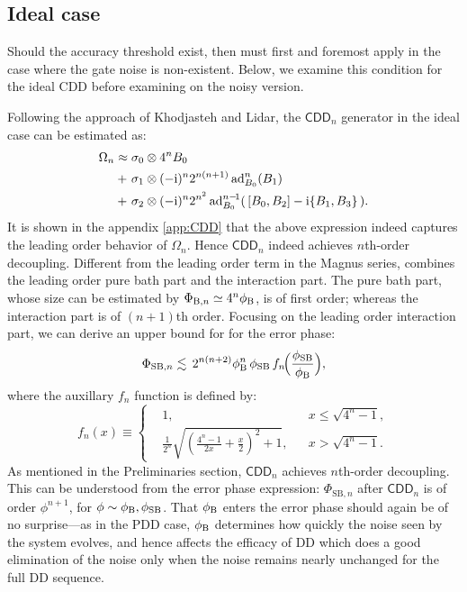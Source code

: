 \documentclass[pra,reprint,superscriptaddress]{revtex4-2}
\newcommand{\CDDn}{\mathsf{CDD}_n}
\begin{document}
\subsection{Ideal case}
Should the accuracy threshold exist, then  must first and foremost apply in the case where the gate noise is non-existent. 
 Below, we examine this condition for the ideal CDD before examining on the noisy version.

Following the approach of Khodjasteh and Lidar, the $\CDDn$ generator in the ideal case can be estimated as:
\begin{align}\label{eq:cdd-generator-est}
\Omega_{n} 
\approx {} & \sigma_0 \otimes 4^n B_0 \notag \\
+\ & \sigma_1 \otimes (-\mathrm{i})^{n} 2^{n(n+1)} \operatorname{ad}_{B_0}^{n}(B_1)\\ 
+\ & \sigma_2 \otimes (-\mathrm{i})^{n} 2^{n^2} \operatorname{ad}_{B_0}^{n-\!1}( \,[B_0,B_2] - \mathrm{i} \{B_1,B_3\} \,). \notag
\end{align} 
It is shown in the appendix \ref{app:CDD}   that the above expression indeed captures the leading order behavior of $\Omega_{n}$. Hence $\CDDn$ indeed achieves $n$th-order decoupling. Different from the leading order term in the Magnus series,  combines the leading order pure bath part and the interaction part. 
The pure bath part, whose size can be estimated by $\Phi_{\mathrm{B},n} \simeq 4^n\phi_{\mathrm{B}}$, is of first order; whereas the interaction part is of $(n+1)$th order. 
Focusing on the leading order interaction part, we can derive an upper bound for for the error phase: 
\begin{equation}\label{eq:CDDerrph-ub}
\Phi_{\mathrm{SB},n} \lesssim \,
2^{n(n+2)} \phi_{\mathrm{B}}^{n}\,\phi_{\mathrm{SB}} \,f_n\!\Bigl(\frac{\phi_{\mathrm{SB}}}{\phi_{\mathrm{B}}}\Bigr),
\end{equation}
where the auxillary $f_n$ function is defined by:
\begin{equation}
 f_n(x) \equiv\left\{
 \begin{aligned}
 &1, && x \le  \sqrt{4^n-1}, \\
 &\frac{1}{2^n} \sqrt{\left(\frac{4^n-1}{2x}+\frac{x}{2}\right)^2+1}, &&
 x > \sqrt{4^n-1}.
 \end{aligned}
 \right.
\end{equation}
As mentioned in the Preliminaries section, $\CDDn$ achieves $n$th-order decoupling. This can be understood from the error phase expression: $\Phi_{\mathrm{SB},n}$ after $\CDDn$ is of order $\phi^{n+1}$, for $\phi\sim\phi_{\mathrm{B}}, \phi_{\mathrm{SB}}$. That $\phi_{\mathrm{B}}$ enters the error phase should again be of no surprise---as in the PDD case, $\phi_{\mathrm{B}}$ determines how quickly the noise seen by the system evolves, and hence affects the efficacy of DD which does a good elimination of the noise only when the noise remains nearly unchanged for the full DD sequence. 
\end{document}
